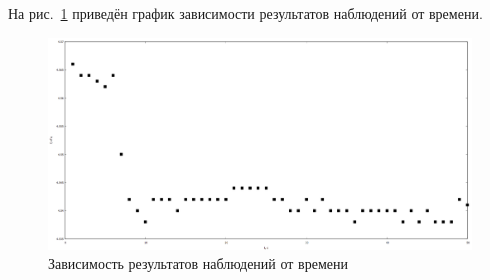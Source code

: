 На рис.~\ref{fig:graph1} приведён график зависимости результатов наблюдений от времени.
\begin{figure}[H]
\centering
\includegraphics[width=1.0\textwidth]{graph1}
\caption{Зависимость результатов наблюдений от времени}
\label{fig:graph1}
\end{figure}

